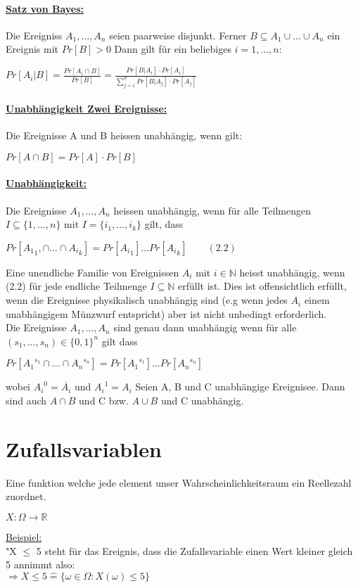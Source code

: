 \documentclass[8pt]{extreport}
\begin{document}
\paragraph{\underline{Satz von Bayes:}} Die Ereigniss $A_{1},\dots,A_{n}$ seien paarweise disjunkt. Ferner $B\subseteq A_1 \cup \dots \cup A_n$ ein Ereignis mit $Pr[B] > 0$ Dann gilt für ein beliebiges $i=1,\dots, n$:
\begin{center}
$Pr[A_i|B] =\frac{Pr[A_i \cap B]}{Pr[B]} = \frac{Pr[B|A_i]\cdot Pr[A_i]}{\displaystyle\sum_{j=1}^{n} Pr[B|A_j] \cdot Pr[A_j]}$
\end{center}
\paragraph{\underline{Unabhängigkeit Zwei Ereignisse:}} Die Ereignisse A und B heissen unabhängig, wenn gilt:
\begin{center}
$Pr[A\cap B] = Pr[A] \cdot Pr[B]$
\end{center}
\paragraph{\underline{Unabhängigkeit:}} Die Ereignisse $A_1, \dots, A_n$ heissen unabhängig, wenn für alle Teilmengen $I\subseteq \{1, \dots, n\}$ mit $I = \{i_1, \dots ,i_k\}$ gilt, dass
\begin{center}
$Pr[{A_1}_1, \cap \dots \cap {A_i}_k] = Pr[{A_i}_1] \dots Pr[{A_i}_k] \qquad (2.2)$
\end{center}
Eine unendliche Familie von Ereignissen $A_i$ mit $ i \in \mathbb{N}$ heisst unabhängig, wenn (2.2) für jede endliche Teilmenge $I\subseteq \mathbb{N}$ erfüllt ist. Dies ist offensichtlich erfüllt, wenn die Ereignisse physikalisch unabhängig sind (e.g wenn jedes $A_i$ einem unabhängigem Münzwurf entspricht) aber ist nicht unbedingt erforderlich.\\
Die Ereignisse $A_1, \dots , A_n$ sind genau dann unabhängig wenn für alle $(s_1,\dots , s_n) \in \{0,1\}^n$ gilt dass
\begin{center}
$ Pr[{A_1}^{s_1} \cap \dots \cap {A_n}^{s_n}] = Pr[{A_1}^{s_1}] \dots Pr[{A_n}^{s_n}]$
\end{center}
wobei ${A_i}^0 = \overline{A_i}$ und ${A_i}^1 = {A_i}$
\newline
Seien A, B und C unabhängige Ereignisee. Dann sind auch $A \cap B$ und C bzw. $A \cup B$ und C unabhängig.
\section{Zufallsvariablen} Eine funktion welche jede element unser Wahrscheinlichkeitsraum ein Reellezahl zuordnet.
\begin{center}
$ X : \Omega \rightarrow \mathbb{R} $
\end{center}
\underline{Beispiel:}\\
"X $\leq$ 5 steht für das Ereignis, dass die Zufallsvariable einen Wert kleiner gleich 5 annimmt also:\\
$\Rightarrow X \leq 5 \hat{=} \{ \omega \in \Omega : X(\omega) \leq 5 \}$
\end{document}

